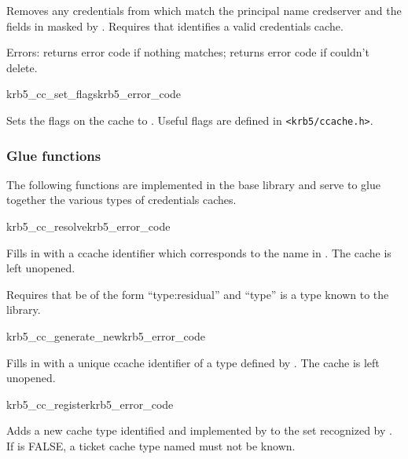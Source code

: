 Removes any credentials from  which match the principal
name {cred{\ptsto}server} and the fields in  masked by
.
Requires that  identifies a valid credentials cache.

Errors: returns error code if nothing matches; returns error code if
couldn't delete.

\begin{funcdecl}{krb5_cc_set_flags}{krb5_error_code}{\funcin}
\end{funcdecl}

Sets the flags on the cache  to .  Useful
flags are defined in {\tt <krb5/ccache.h>}.


\subsubsection{Glue functions}
The following functions are implemented in the base library and serve to
glue together the various types of credentials caches.


\begin{funcdecl}{krb5_cc_resolve}{krb5_error_code}{\funcin}
\funcout
{}
\end{funcdecl}

Fills in  with a ccache identifier which corresponds to
the name in .  The cache is left unopened.

Requires that  be of the form ``type:residual'' and
``type'' is a type known to the library.

\begin{funcdecl}{krb5_cc_generate_new}{krb5_error_code}{\funcin}
\funcout
{}
\end{funcdecl}


Fills in  with a unique ccache identifier of a type defined by
.  The cache is left unopened.

\begin{funcdecl}{krb5_cc_register}{krb5_error_code}{\funcin}
\end{funcdecl}

Adds a new cache type identified and implemented by  to
the set recognized by .
If  is FALSE, a ticket cache type named
 must not be known.

